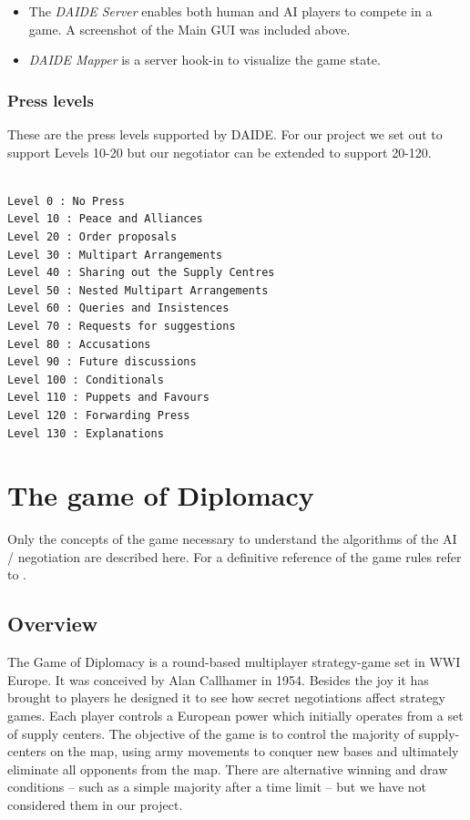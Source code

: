 \documentclass[pdftex,11pt,a4paper]{report}
\begin{document}
\begin{itemize}

\item The \textit{DAIDE Server} enables both human and AI players to
      compete in a game. A screenshot of the Main GUI was included above.

\item \textit{DAIDE Mapper} is a server hook-in to visualize
      the game state.

\end{itemize}

\subsection{Press levels}

These are the press levels supported by DAIDE. For our project 
we set out to support Levels 10-20 but our negotiator can be 
extended to support 20-120.

\begin{verbatim}

Level 0 : No Press
Level 10 : Peace and Alliances
Level 20 : Order proposals
Level 30 : Multipart Arrangements
Level 40 : Sharing out the Supply Centres
Level 50 : Nested Multipart Arrangements
Level 60 : Queries and Insistences
Level 70 : Requests for suggestions
Level 80 : Accusations
Level 90 : Future discussions
Level 100 : Conditionals
Level 110 : Puppets and Favours
Level 120 : Forwarding Press
Level 130 : Explanations

\end{verbatim}



\pagebreak

\chapter{The game of Diplomacy}

Only the concepts of the game necessary to understand the 
algorithms of the AI / negotiation are described here. For a
definitive reference of the game rules refer to \cite{DiploRules00}.

\section{Overview}

The Game of Diplomacy is a round-based multiplayer strategy-game set
in WWI Europe. It was conceived by Alan Callhamer in 1954. Besides
the joy it has brought to players he designed it to see how 
secret negotiations affect strategy games. Each player controls a 
European power which initially operates from a set of supply centers.
The objective of the game is to control the majority of supply-centers
on the map, using army movements to conquer new bases and ultimately
eliminate all opponents from the map. There are alternative winning
and draw conditions -- such as a simple majority after a time limit -- 
but we have not considered them in our project.
\end{document}
